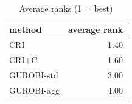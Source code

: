 \begin{table}[htbp]
\centering
\small
\caption{Average ranks (1 = best)}
\label{tab:E3x_long_runs_xlarge_b600_ranks}
\begin{tabular}{lr}
\toprule
method & average rank \\
\midrule
CRI & 1.40 \\
CRI+C & 1.60 \\
GUROBI-std & 3.00 \\
GUROBI-agg & 4.00 \\
\bottomrule
\end{tabular}
\end{table}

